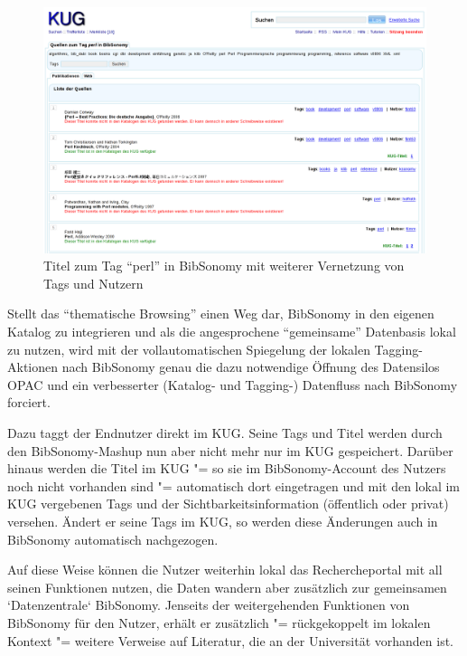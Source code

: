 \documentclass[11pt]{scrartcl}
\begin{document}
\begin{figure}
    \centering \begin{minipage}[b]{1.0\textwidth}
      \centering \includegraphics[width=15cm]{bib20-kug-mashups_bilder/bibsonomy-publist.png}
    \end{minipage}
    \caption{Titel zum Tag "`perl"' in BibSonomy mit weiterer Vernetzung von Tags und Nutzern}
  \label{bild:bibsonomy-publist}
\end{figure}

Stellt das "`thematische Browsing"' einen Weg dar, BibSonomy in den
eigenen Katalog zu integrieren und als die angesprochene
"`gemeinsame"' Datenbasis lokal zu nutzen, wird mit der
vollautomatischen Spiegelung der lokalen Tagging-Aktionen nach
BibSonomy genau die dazu notwendige Öffnung des Datensilos OPAC und
ein verbesserter (Katalog- und Tagging-) Datenfluss nach BibSonomy
forciert.

Dazu taggt der Endnutzer direkt im KUG. Seine Tags und Titel werden
durch den BibSonomy-Mashup nun aber nicht mehr nur im KUG gespeichert.
Darüber hinaus werden die Titel im KUG "= so sie im BibSonomy-Account
des Nutzers noch nicht vorhanden sind "= automatisch dort eingetragen
und mit den lokal im KUG vergebenen Tags und der
Sichtbarkeitsinformation (öffentlich oder privat) versehen. Ändert er
seine Tags im KUG, so werden diese Änderungen auch in BibSonomy
automatisch nachgezogen.

Auf diese Weise können die Nutzer weiterhin lokal das Rechercheportal
mit all seinen Funktionen nutzen, die Daten wandern aber zusätzlich
zur gemeinsamen ‘Datenzentrale‘ BibSonomy. Jenseits der weitergehenden
Funktionen von BibSonomy für den Nutzer, erhält er zusätzlich "=
rückgekoppelt im lokalen Kontext "= weitere Verweise auf  Literatur,
die an der Universität vorhanden ist.
\end{document}
